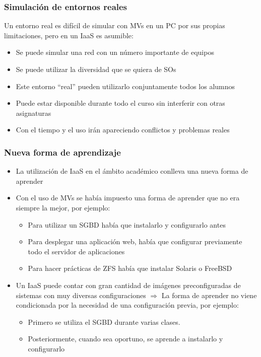 \documentclass{beamer}
\begin{document}
\begin{frame}
  \frametitle{Simulación de entornos reales}
  Un entorno real es difícil de simular con MVs en un PC por sus
    propias limitaciones, pero en un IaaS es asumible:
    \begin{itemize}
    \item Se puede simular una red con un número importante de equipos
    \item Se puede utilizar la diversidad que se quiera de SOs
    \item Este entorno ``real'' pueden utilizarlo conjuntamente todos los
      alumnos
    \item Puede estar disponible durante todo el curso sin interferir con otras
      asignaturas
    \item Con el tiempo y el uso irán apareciendo conflictos y problemas reales
    \end{itemize}
\end{frame}
\begin{frame}
  \frametitle{Nueva forma de aprendizaje}
  \begin{itemize}
  \item La utilización de IaaS en el ámbito académico conlleva una nueva forma
    de aprender
  \item Con el uso de MVs se había impuesto una forma de aprender que no era
    siempre la mejor, por ejemplo:
    \begin{itemize}
    \item Para utilizar un SGBD había que instalarlo y configurarlo antes
    \item Para desplegar una aplicación web, había que configurar previamente
      todo el servidor de aplicaciones
    \item Para hacer prácticas de ZFS había que instalar Solaris o FreeBSD
    \end{itemize}
    \item Un IaaS puede contar con gran cantidad de imágenes preconfiguradas de
      sistemas con muy diversas configuraciones $\Rightarrow$ La forma de
      aprender no viene condicionada por la necesidad de una configuración
      previa, por ejemplo:
      \begin{itemize}
      \item Primero se utiliza el SGBD durante varias clases.
      \item Posteriormente, cuando sea oportuno, se aprende a instalarlo y
        configurarlo
      \end{itemize}
  \end{itemize}
\end{frame}
\end{document}
